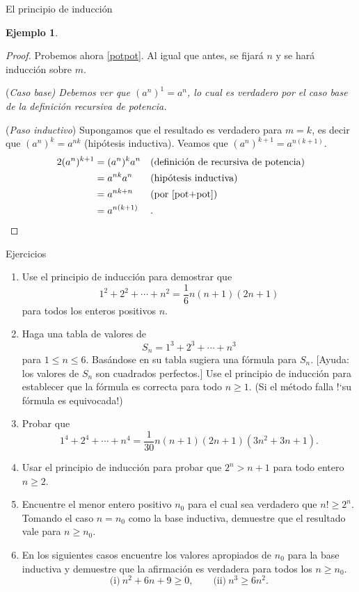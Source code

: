 \documentclass[11pt,spanish,makeidx]{amsbook}
\theoremstyle{definition}
\newtheorem{ejemplo}{Ejemplo}[section]
\theoremstyle{remark}
\begin{document}
\begin{section}{El principio de inducción}
\begin{ejemplo}
\begin{proof}
Probemos ahora \ref{potpot}. Al igual que antes, se fijará $n$ y se hará inducción sobre $m$.

\noindent(\it Caso  base\rm) Debemos ver que $(a^n)^1 = a^n$, lo cual es verdadero por el caso base de la definición recursiva de potencia. 

\noindent ({\it Paso  inductivo}) Supongamos que el resultado es verdadero para $m=k$, es decir que  $(a^n)^k = a^{nk}$ (hipótesis inductiva). Veamos que  $(a^n)^{k+1} = a^{n(k+1)}$. 
\begin{alignat*}2
(a^n)^{k+1} &= (a^n)^{k}a^n&  & \text{(definición de recursiva de potencia)} \\
&= a^{nk}a^n& & \text{(hipótesis inductiva)} \\
&= a^{nk+n}&  & \text{(por \ref{pot+pot})}\\
&= a^{n(k+1)}&  &.  
\end{alignat*}

\end{proof}
\end{ejemplo}

\begin{subsection}{Ejercicios}
\begin{enumerate}
\item Use el principio de inducción para demostrar que
$$
1^2+2^2+\cdots +n^2 = \frac16 n(n+1)(2n +1)
$$
para todos los enteros positivos $n$.
\item Haga una tabla de valores de
$$
S_n = 1^3+2^3+\cdots +n^3
$$
para $1 \le n\le 6$. Basándose en su tabla sugiera una fórmula para $S_n$. [Ayuda: los valores de $S_n$ son cuadrados perfectos.] Use el principio de inducción para establecer que la fórmula es correcta para todo $n\ge 1$. (Si el método falla !`su fórmula es equivocada!)
\item Probar que
$$
1^4+2^4+\cdots+n^4= \frac{1}{30}n(n+1)(2n+1)(3n^2+3n+1).
$$
\item Usar el principio de inducción para probar que $2^n>n+1$ para todo entero $n\ge2$.
\item Encuentre el menor entero positivo $n_0$ para el cual sea verdadero que $n! \ge 2^n$. Tomando el caso $n=n_0$ como la base inductiva, demuestre que el resultado vale para $n\ge n_0$.
\item En los siguientes casos encuentre los valores apropiados de $n_0$ para la base inductiva y demuestre que la afirmación es verdadera para todos los $n\ge n_0$.
$$
\text{(i)} \ n^2 +6n + 9 \ge 0, \qquad \text{(ii)} \ n^3 \ge 6n^2.
$$
\end{enumerate}
\end{subsection}
\end{section}
\end{document}
